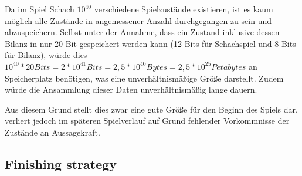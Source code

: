 Da im Spiel Schach $10^40$ verschiedene Spielzustände existieren, ist es kaum möglich alle Zustände in angemessener Anzahl durchgegangen zu sein und abzuspeichern. Selbst unter der Annahme, dass ein Zustand inklusive dessen Bilanz in nur 20 Bit gespeichert werden kann (12 Bits für Schachspiel und 8 Bits für Bilanz), würde dies $10^40 * 20 Bits = 2 * 10^41 Bits = 2,5 * 10^40 Bytes = 2,5 * 10^25 Petabytes$ an Speicherplatz benötigen, was eine unverhältnismäßige Größe darstellt. Zudem würde die Ansammlung dieser Daten unverhältnismäßig lange dauern.


Aus diesem Grund stellt dies zwar eine gute Größe für den Beginn des Spiels dar, verliert jedoch im späteren Spielverlauf auf Grund fehlender Vorkommnisse der Zustände an Aussagekraft.

\subsection{Finishing strategy}
